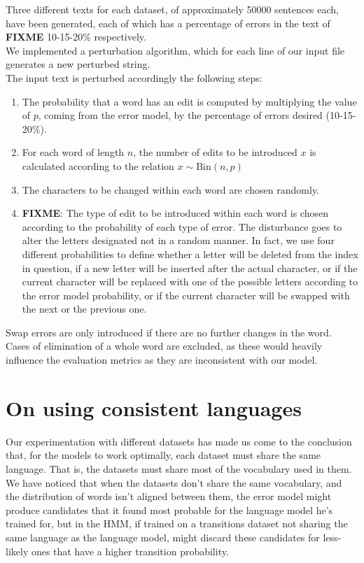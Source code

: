 Three different texts for each dataset, of approximately \num{50000} sentences each, have been generated, 
each of which has a percentage of errors in the text of \textbf{FIXME} \num{10}-\num{15}-\num{20}\% 
respectively. \\

We implemented a perturbation algorithm, which for each line of our input file generates a new perturbed 
string.\\
The input text is perturbed accordingly the following steps:

\begin{enumerate}
	\item The probability that a word has an edit is computed by multiplying the value of $p$, coming from the 
	error model, by the percentage of errors desired (10-15-20\%).
	\item For each word of length $n$, the number of edits to be introduced $x$ is calculated according to the 
	relation $x \sim \text{Bin}(n, p)$
	\item The characters to be changed within each word are chosen randomly.
	\item \textbf{FIXME}: The type of edit to be introduced within each word is chosen according to the 
	probability of each type of error. 
	The disturbance goes to alter the letters designated not in a random manner. 
	In fact, we use four different probabilities to define whether a letter will be deleted from the index in question, 
	if a new letter will be inserted after the actual character, or if the current character will be replaced with one of 
	the possible letters according to the error model probability, or if the current character will be swapped with 
	the next or the previous one.
	
\end{enumerate}

Swap errors are only introduced if there are no further changes in the word. Cases of elimination of a whole 
word are excluded, as these would heavily influence the evaluation metrics as they are inconsistent with our 
model. 

\section{On using consistent languages}
Our experimentation with different datasets has made us come to the conclusion that, for the models to work 
optimally, each dataset must share the same language. That is, the datasets must share most of the vocabulary 
used in them. We have noticed that when the datasets don't share the same vocabulary, and the distribution of 
words isn't aligned between them, the error model might produce candidates that it found most probable for 
the language model he's trained for, but in the HMM, if trained on a transitions dataset not sharing the same 
language as the language model, might discard these candidates for less-likely ones that have a higher 
transition probability.



